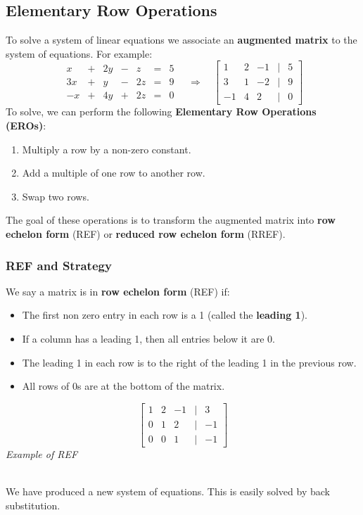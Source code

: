 \documentclass[a4paper, 9pt]{extarticle}
\begin{document}
\subsection{Elementary Row Operations}
To solve a system of linear equations we associate an \textbf{augmented matrix} to the system of equations. For example:
$$
  \begin{array}
    {ccccccc}x & + & 2y & - & z  & = & 5 \\
    3x         & + & y  & - & 2z & = & 9 \\
    -x         & + & 4y & + & 2z & = & 0
  \end{array}
  \quad \Rightarrow \quad
  \begin{bmatrix}
    1  & 2 & -1 & | & 5 \\
    3  & 1 & -2 & | & 9 \\
    -1 & 4 & 2  & | & 0
  \end{bmatrix}
$$
To solve, we can perform the following \textbf{Elementary Row Operations (EROs)}:
\begin{enumerate}
  \item Multiply a row by a non-zero constant.
  \item Add a multiple of one row to another row.
  \item Swap two rows.
\end{enumerate}
The goal of these operations is to transform the augmented matrix into \textbf{row echelon form} (REF) or \textbf{reduced row echelon form} (RREF).

\subsubsection{REF and Strategy}
\begin{minipage}{0.8\textwidth}
  We say a matrix is in \textbf{row echelon form} (REF) if:
  \begin{itemize}
    \item The first non zero entry in each row is a 1 (called the \textbf{leading 1}).
    \item If a column has a leading 1, then all entries below it are 0.
    \item The leading 1 in each row is to the right of the leading 1 in the previous row.
    \item All rows of 0s are at the bottom of the matrix.
  \end{itemize}
\end{minipage}
\begin{minipage}{0.2\textwidth}
  \begin{center}
    $$
      \begin{bmatrix}
        1 & 2 & -1 & | & 3  \\
        0 & 1 & 2  & | & -1 \\
        0 & 0 & 1  & | & -1
      \end{bmatrix}
    $$
    \emph{Example of REF}
  \end{center}


\end{minipage} \\[2ex]
We have produced a new system of equations. This is easily solved by back substitution.
\end{document}
